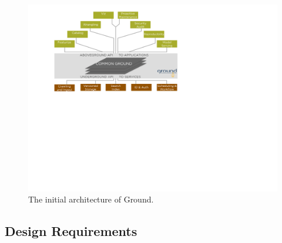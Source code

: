 \documentclass{sig-alternate}
\begin{document}






\begin{figure}[t]
\centering
\includegraphics[width=0.75\linewidth]{groundarch.pdf}
\caption{The initial architecture of Ground.}
\label{fig:arch}
\end{figure}

\subsection{Design Requirements}

\end{document}
